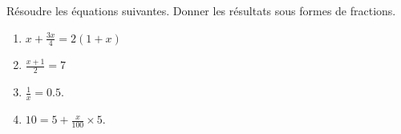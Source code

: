 
\begin{exercice}\label{exosmath-0005}

    Résoudre les équations suivantes. Donner les résultats sous formes de fractions.
    \begin{multicols}{2}
        \begin{enumerate}
            \item
        $x+\frac{ 3x }{ 4 }=2(1+x)$
    \item
        \( \frac{ x+1 }{2}=7\)
    \item
        \( \frac{1}{ x }=0.5\).
    \item
        \( 10=5+\frac{ x }{ 100 }\times 5\).
        \end{enumerate}
    \end{multicols}

\end{exercice}
